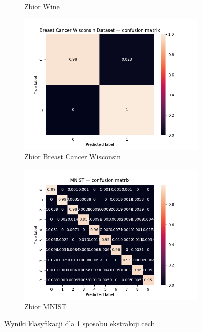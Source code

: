 \documentclass[12pt]{article}
\begin{document}
\begin{figure}[H]
\begin{subfigure}[t]{0.3\textwidth}
            \caption{Zbior Wine}
        \end{subfigure}
        \hfill
        \begin{subfigure}[t]{0.3\textwidth}
            \includegraphics[width=\linewidth]{img/cancer_cm.png}
            \caption{Zbior Breast Cancer Wisconsin}
        \end{subfigure}
        \begin{subfigure}[t]{0.5\textwidth}
            \includegraphics[width=\linewidth]{img/mnist_flat_cm.png}
            \caption{Zbior MNIST}
        \end{subfigure}
        \caption{Wyniki klasyfikacji dla 1 sposobu ekstrakcji cech}
    \end{figure}
\end{document}
